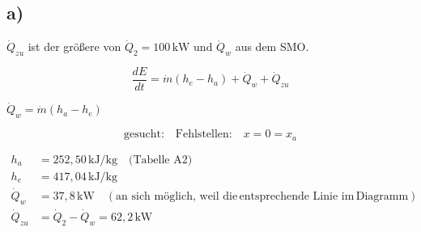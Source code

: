 

\subsection*{a)}
\(\dot{Q}_{zu}\) ist der größere von \(\dot{Q}_2 = 100 \, \text{kW}\) und \(\dot{Q}_w\) aus dem SMO.

\[
\frac{dE}{dt} = \dot{m} (h_e - h_a) + \dot{Q}_w + \dot{Q}_{zu}
\]

\(\dot{Q}_w = \dot{m} (h_a - h_e)\)

\[
\text{gesucht:} \quad \text{Fehlstellen:} \quad x = 0 = x_a
\]

\[
\begin{aligned}
    h_a &= 252,50 \, \text{kJ/kg} \quad \text{(Tabelle A2)} \\
    h_e &= 417,04 \, \text{kJ/kg} \\
    \dot{Q}_w &= 37,8 \, \text{kW} \quad \left(\text{an sich möglich, weil die} \, \text{entsprechende Linie im} \, \text{Diagramm}\right) \\
    \dot{Q}_{zu} &= \dot{Q}_2 - \dot{Q}_w = 62,2 \, \text{kW}
\end{aligned}
\]